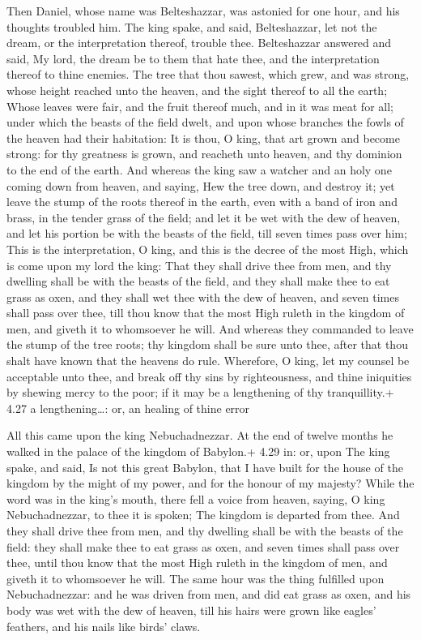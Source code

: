  Then Daniel, whose name was Belteshazzar, was astonied
for one hour, and his thoughts troubled him. The king spake, and said,
Belteshazzar, let not the dream, or the interpretation thereof, trouble
thee. Belteshazzar answered and said, My lord, the dream be to them that
hate thee, and the interpretation thereof to thine enemies.
 The tree that thou sawest, which grew, and was strong,
whose height reached unto the heaven, and the sight thereof to all the
earth;  Whose leaves were fair, and the fruit thereof much,
and in it was meat for all; under which the beasts of the field dwelt,
and upon whose branches the fowls of the heaven had their habitation:
 It is thou, O king, that art grown and become strong: for
thy greatness is grown, and reacheth unto heaven, and thy dominion to
the end of the earth.  And whereas the king saw a watcher
and an holy one coming down from heaven, and saying, Hew the tree down,
and destroy it; yet leave the stump of the roots thereof in the earth,
even with a band of iron and brass, in the tender grass of the field;
and let it be wet with the dew of heaven, and let his portion be with
the beasts of the field, till seven times pass over him; 
This is the interpretation, O king, and this is the decree of the most
High, which is come upon my lord the king:  That they shall
drive thee from men, and thy dwelling shall be with the beasts of the
field, and they shall make thee to eat grass as oxen, and they shall wet
thee with the dew of heaven, and seven times shall pass over thee, till
thou know that the most High ruleth in the kingdom of men, and giveth it
to whomsoever he will.  And whereas they commanded to leave
the stump of the tree roots; thy kingdom shall be sure unto thee, after
that thou shalt have known that the heavens do rule. 
Wherefore, O king, let my counsel be acceptable unto thee, and break off
thy sins by righteousness, and thine iniquities by shewing mercy to the
poor; if it may be a lengthening of thy tranquillity.+ 4.27 a
lengthening\ldots: or, an healing of thine error

 All this came upon the king Nebuchadnezzar.
 At the end of twelve months he walked in the palace of the
kingdom of Babylon.+ 4.29 in: or, upon  The king spake, and
said, Is not this great Babylon, that I have built for the house of the
kingdom by the might of my power, and for the honour of my majesty?
 While the word was in the king's mouth, there fell a voice
from heaven, saying, O king Nebuchadnezzar, to thee it is spoken; The
kingdom is departed from thee.  And they shall drive thee
from men, and thy dwelling shall be with the beasts of the field: they
shall make thee to eat grass as oxen, and seven times shall pass over
thee, until thou know that the most High ruleth in the kingdom of men,
and giveth it to whomsoever he will.  The same hour was the
thing fulfilled upon Nebuchadnezzar: and he was driven from men, and did
eat grass as oxen, and his body was wet with the dew of heaven, till his
hairs were grown like eagles' feathers, and his nails like birds' claws.

